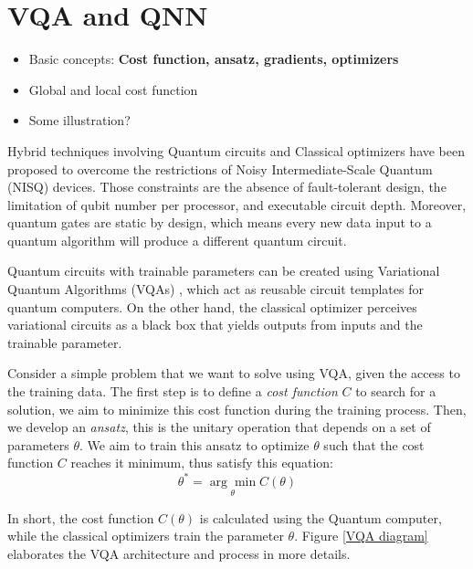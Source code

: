 \section{VQA and QNN}
\begin{itemize}
    \item Basic concepts: \textbf{Cost function, ansatz, gradients, optimizers}
    \item Global and local cost function
    \item Some illustration?
\end{itemize}

Hybrid techniques involving Quantum circuits and Classical optimizers have been proposed to overcome the restrictions of Noisy Intermediate-Scale Quantum (NISQ) \cite{brooksQuantumSupremacyHunt2019} devices. 
Those constraints are the absence of fault-tolerant design, the limitation of qubit number per processor, and executable circuit depth. 
Moreover, quantum gates are static by design, which means every new data input to a quantum algorithm will produce a different quantum circuit.

Quantum circuits with trainable parameters can be created using Variational Quantum Algorithms (VQAs) \cite{cerezo2021variational}, which act as reusable circuit templates for quantum computers.
On the other hand, the classical optimizer perceives variational circuits as a black box that yields outputs from inputs and the trainable parameter.

Consider a simple problem that we want to solve using VQA, given the access to the training data.
The first step is to define a \textit{cost function} $C$ to search for a solution, we aim to minimize this cost function during the training process.
Then, we develop an \textit{ansatz}, this is the unitary operation that depends on a set of parameters $\theta$. We aim to train this ansatz to optimize $\theta$ such that the cost function $C$ reaches it minimum, thus satisfy this equation:
\begin{equation}
    \theta^* = \underset{\theta}{\arg \min} C(\theta)
    \label{optimize theta with ansatz}
\end{equation}

In short, the cost function $C(\theta)$ is calculated using the Quantum computer, while the classical optimizers train the parameter $\theta$. Figure \ref{VQA diagram} elaborates the VQA architecture and process in more details.

